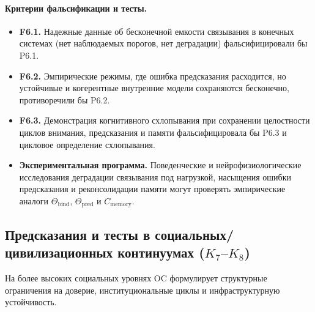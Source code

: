 \paragraph{Критерии фальсификации и тесты.}
\begin{itemize}
  \item \textbf{F6.1.}
        Надежные данные об бесконечной емкости связывания в конечных системах
        (нет наблюдаемых порогов, нет деградации) фальсифицировали бы P6.1.
  \item \textbf{F6.2.}
        Эмпирические режимы, где ошибка предсказания расходится, но устойчивые и
        когерентные внутренние модели сохраняются бесконечно, противоречили бы
        P6.2.
  \item \textbf{F6.3.}
        Демонстрация когнитивного схлопывания при сохранении целостности
        циклов внимания, предсказания и памяти фальсифицировала бы P6.3 и
        цикловое определение схлопывания.
  \item \textbf{Экспериментальная программа.}
        Поведенческие и нейрофизиологические исследования деградации
        связывания под нагрузкой, насыщения ошибки предсказания и
        реконсолидации памяти могут проверять эмпирические аналоги
        \(\Theta_{\mathrm{bind}}\), \(\Theta_{\mathrm{pred}}\) и
        \(C_{\mathrm{memory}}\).
\end{itemize}

\subsection{Предсказания и тесты в социальных/цивилизационных континуумах
            (\texorpdfstring{$K_7$}{K\_7}--\texorpdfstring{$K_8$}{K\_8})}

На более высоких социальных уровнях OC формулирует структурные ограничения на
доверие, институциональные циклы и инфраструктурную устойчивость.


